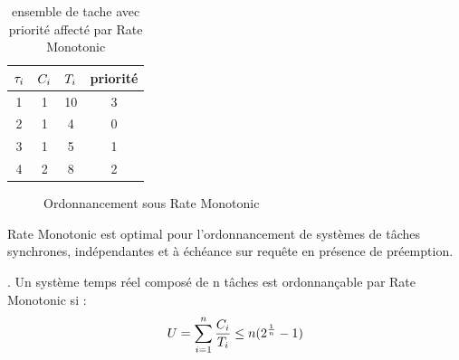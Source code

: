 \begin{table}[h]
\begin{center}
\begin{tabular}{|c|c|c|c|}
 \hline $\tau_{i}$ & $C_{i}$ & $T_{i}$ & priorité\\ 
 \hline 1 & 1 & 10 & 3\\ 
 \hline 2 & 1 & 4 & 0\\ 
 \hline 3 & 1 & 5 & 1\\ 
 \hline 4 & 2 & 8 & 2\\ 
 \hline
 \end{tabular}
\end{center}
\caption{ensemble de tache avec priorité affecté par Rate Monotonic} \label{tab:exempleRM}
\end{table}

\vspace{1cm}

\begin{figure}[h]
\begin{center}
\begin{RTGrid}[height=4cm,width=12cm,labelsize=8pt,numbersize=6]{4}{13}
\end{RTGrid}
\caption{Ordonnancement sous Rate Monotonic} \label{fig:exempleRM}
\end{center}
\end{figure}
\vspace{1cm}

\begin{theoreme}
Rate Monotonic est optimal pour l'ordonnancement de systèmes de tâches synchrones, indépendantes et à échéance sur requête en présence de préemption.
\end{theoreme}

\begin{theoreme}. Un système temps réel composé de n tâches est ordonnançable par Rate Monotonic si :
\begin{equation}
U = \sum_{i=1}^n \frac{C_{i}}{T_{i}} \leq n ( 2^{\frac{1}{n}} - 1)
\end{equation}
\end{theoreme}

